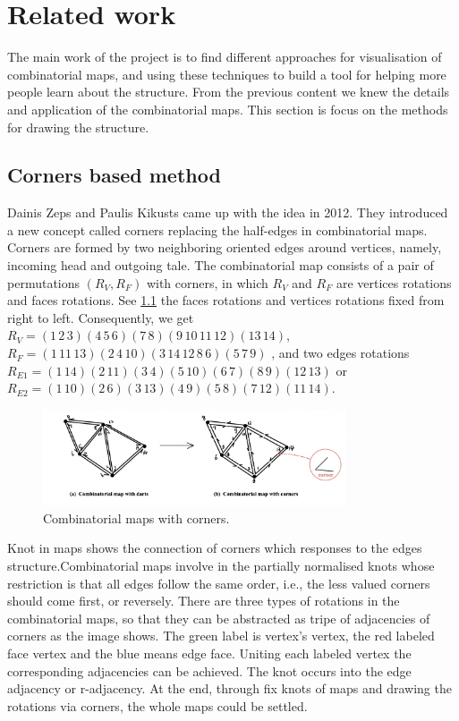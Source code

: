 
\chapter{Related work}

The main work of the project is to find different approaches for visualisation of combinatorial maps, and using these techniques to build a tool for helping more people learn about the structure. From the previous content we knew the details and application of the combinatorial maps. This section is focus on the methods for drawing the structure.

\section{Corners based method}

Dainis Zeps and Paulis Kikusts \cite{zeps2012draw} came up with the idea in 2012. They introduced a new concept called corners replacing the half-edges in combinatorial maps. Corners are formed by two neighboring oriented edges around vertices, namely, incoming head and outgoing tale. The combinatorial map consists of a pair of  permutations \((R_V,R_F)\) with corners, in which \(R_V\) and \(R_F\) are vertices rotations and faces rotations. See \cref{fig:figures:corner} the faces rotations and vertices rotations fixed from right to left. Consequently, we get \(R_V=(1\,2\,3)(4\,5\,6)(7\,8)(9\,10\,11\,12)(13\,14)\), \(R_F=(1\,11\,13)(2\,4\,10)(3\,14\,12\,8\,6)(5\,7\,9)\) , and two edges rotations \(R_{E1}=(1\,14)(2\,11)(3\,4)(5\,10)(6\,7)(8\,9)(12\,13)\) or \\\(R_{E2}=(1\,10)(2\,6)(3\,13)(4\,9)(5\,8)(7\,12)(11\,14)\).

\begin{figure}[htb]
    \centering
    \includegraphics[width=0.8\textwidth]{../../image/corner.png}
    \caption{Combinatorial maps with corners.}
    \label{fig:figures:corner}
  \end{figure}

  Knot in maps shows the connection of corners which responses to the edges structure.Combinatorial maps involve in the partially normalised knots whose restriction is that all edges follow the same order, i.e., the less valued corners should come first, or reversely. There are three types of rotations in the combinatorial maps, so that they can be abstracted as tripe of adjacencies of corners as the image shows. The green label is vertex’s vertex, the red labeled face vertex and the blue means edge face. Uniting each labeled vertex the corresponding adjacencies can be achieved. The knot occurs into the edge adjacency or r-adjacency. At the end, through fix knots of maps and drawing the rotations via corners, the whole maps could be settled.

